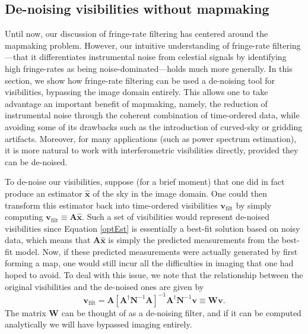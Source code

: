 \documentclass[twocolumn,apj,numberedappendix]{emulateapj}
\newcommand{\vis}{\mathbf{v}}
\newcommand{\xhat}{\hat{\mathbf{x}}}
\newcommand{\A}{\mathbf{A}}
\newcommand{\N}{\mathbf{N}}
\begin{document}
\subsection{De-noising visibilities without mapmaking}
Until now, our discussion of fringe-rate filtering has centered around the mapmaking problem.  However, our intuitive understanding of fringe-rate filtering---that it differentiates instrumental noise from celestial signals by identifying high fringe-rates as being noise-dominated---holds much more generally.    In this section, we show how fringe-rate filtering can be used a de-noising tool for visibilities, bypassing the image domain entirely.  This allows one to take advantage an important benefit of mapmaking, namely, the reduction of instrumental noise through the coherent combination of time-ordered data, while avoiding some of its drawbacks such as the introduction of curved-sky or gridding artifacts.  Moreover, for many applications (such as power spectrum estimation), it is more natural to work with interferometric visibilities directly, provided they can be de-noised.

To de-noise our visibilities, suppose (for a brief moment) that one did in fact produce an estimator $\xhat$ of the sky in the image domain.  One could then transform this estimator back into time-ordered visibilities $\vis_\textrm{filt}$ by simply computing $\vis_\textrm{filt} \equiv \A \xhat$.  Such a set of visibilities would represent de-noised visibilities since Equation \eqref{optEst} is essentially a best-fit solution based on noisy data, which means that $\A \xhat$ is simply the predicted measurements from the best-fit model.  Now, if these predicted measurements were actually generated by first forming a map, one would still incur all the difficulties in imaging that one had hoped to avoid.  To deal with this issue, we note that the relationship between the original visibilities and the de-noised ones are given by
\begin{equation}
\vis_\textrm{filt} = \A \left[ \A^\dagger \N^{-1} \A \right]^{-1} \A^\dagger \N^{-1} \vis \equiv \mathbf{W}  \vis.
\end{equation}
The matrix $\mathbf{W}$ can be thought of as a de-noising filter, and if it can be computed analytically we will have bypassed imaging entirely.
\end{document}
